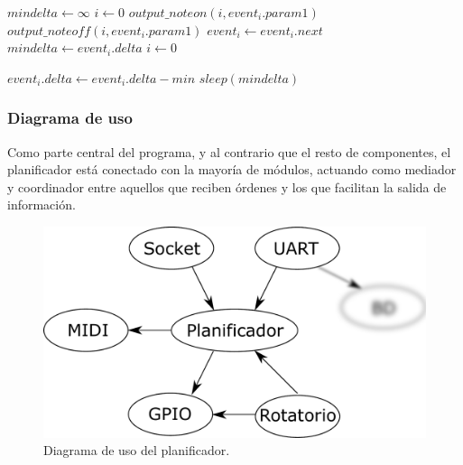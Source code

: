 \begin{algorithmic}
	\LOOP
		\STATE $mindelta \gets \infty$
		\STATE $i\gets 0$
					\STATE $output\_noteon(i, event_i.param1)$
				\ELSE 
						\STATE $output\_noteoff (i, event_i.param1)$
					\ENDIF
				\ENDIF
				\STATE $event_i \gets event_i.next$
			\ENDWHILE
				\STATE $mindelta \gets event_i.delta$
			\ENDIF
		\ENDWHILE
		\STATE $i \gets 0$
		
			\STATE $event_i.delta \gets event_i.delta - min$
		\ENDWHILE
		\STATE $sleep (mindelta)$
	\ENDLOOP
\end{algorithmic}

\subsubsection{Diagrama de uso}

Como parte central del programa, y al contrario que el resto de componentes, el planificador está conectado con la mayoría de módulos, actuando como mediador y coordinador entre aquellos que reciben órdenes y los que facilitan la salida de información.

\smallskip

\begin{figure}[H]
	\noindent \begin{centering}
		\includegraphics[width=\linewidth/2]{capitulo4/daemon_scheduler}
		\par\end{centering}
	\smallskip
	\caption{\label{fig:daemon_scheduler} Diagrama de uso del planificador.}
\end{figure} 

